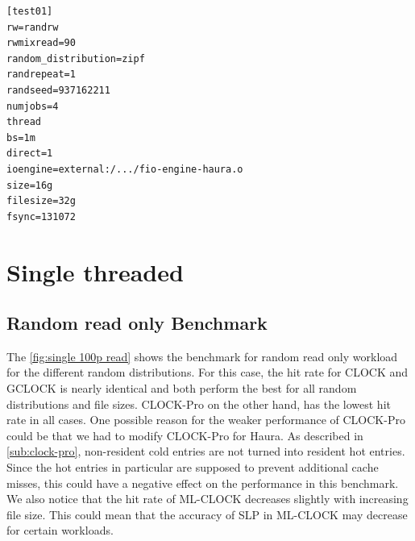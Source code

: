 \documentclass[
	12pt,
	a4paper,
	abstract,
	bibliography=totoc,
	chapterprefix,
	headings=openright,
	numbers=endperiod,
	parskip=half,
	twoside,
]{scrreprt}
\begin{document}
\bigskip
\newpage

\begin{lstlisting}[mathescape=true,caption=example fio jobfile, label=lst:fio jobfile]
[test01]
rw=randrw
rwmixread=90
random_distribution=zipf
randrepeat=1
randseed=937162211
numjobs=4
thread
bs=1m
direct=1
ioengine=external:/.../fio-engine-haura.o
size=16g
filesize=32g
fsync=131072
\end{lstlisting}




\newpage
\section{Single threaded}
\subsection{Random read only Benchmark}

The \cref{fig:single 100p read} shows the benchmark for random read only workload for the different random distributions.
For this case, the hit rate for CLOCK and GCLOCK is nearly identical and both perform the best for all random distributions and file sizes. 
CLOCK-Pro on the other hand, has the lowest hit rate in all cases.
One possible reason for the weaker performance of CLOCK-Pro could be that we had to modify CLOCK-Pro for Haura.
As described in \ref{sub:clock-pro}, non-resident cold entries are not turned into resident hot entries.
Since the hot entries in particular are supposed to prevent additional cache misses, 
this could have a negative effect on the performance in this benchmark.
We also notice that the hit rate of ML-CLOCK decreases slightly with increasing file size.
This could mean that the accuracy of SLP in ML-CLOCK may decrease for certain workloads.
\end{document}

